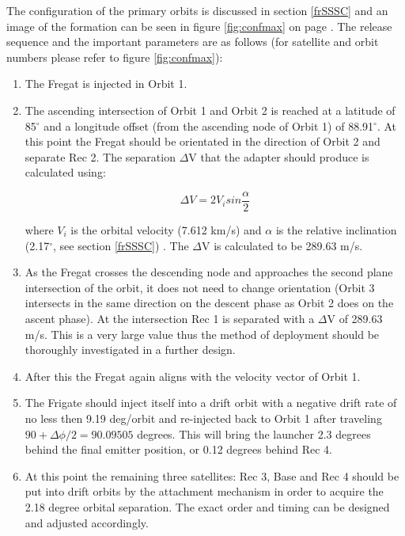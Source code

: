 The configuration of the primary orbits is discussed in section \ref{frSSSC} and an image of the formation can be seen in figure \ref{fig:confmax} on page \pageref{fig:confmax}. The release sequence and the important parameters are as follows (for satellite and orbit numbers please refer to figure \ref{fig:confmax}):

\begin{enumerate}
	\item The Fregat is injected in Orbit 1.
	\item The ascending intersection of Orbit 1 and Orbit 2 is reached at a latitude of 85$^{\circ}$ and a longitude offset (from the ascending node of Orbit 1) of 88.91$^{\circ}$. At this point the Fregat should be orientated in the direction of Orbit 2 and separate Rec 2. The separation $\Delta$V that the adapter should produce is calculated using:
	
	\begin{equation} 
 		\Delta V = 2 V_i sin \frac{\alpha}{2}
	\end{equation}
	
	where $V_i$ is the orbital velocity (7.612 km/s) and $\alpha$ is the relative inclination (2.17$^{\circ}$, see section \ref{frSSSC}) \cite{spacedesign}. The $\Delta$V is calculated to be 289.63 m/s.
	
	\item As the Fregat crosses the descending node and approaches the second plane intersection of the orbit, it does not need to change orientation (Orbit 3 intersects in the same direction on the descent phase as Orbit 2 does on the ascent phase). At the intersection Rec 1 is separated with a $\Delta$V of 289.63 m/s. This is a very large value thus the method of deployment should be thoroughly investigated in a further design. 
	\item After this the Fregat again aligns with the velocity vector of Orbit 1.
	\item The Frigate should inject itself into a drift orbit with a negative drift rate of no less then 9.19 deg/orbit and re-injected back to Orbit 1 after traveling $90+\Delta \phi /2 = 90.09505$ degrees. This will bring the launcher 2.3 degrees behind the final emitter position, or 0.12 degrees behind Rec 4.
	\item At this point the remaining three satellites: Rec 3, Base and Rec 4 should be put into drift orbits by the attachment mechanism in order to acquire the 2.18 degree orbital separation. The exact order and timing can be designed and adjusted accordingly.
\end{enumerate}

